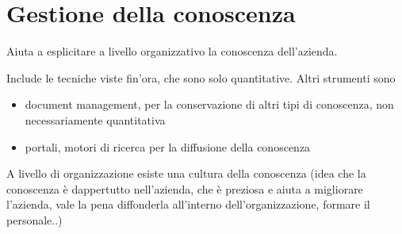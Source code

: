 \section{Gestione della conoscenza}\label{gestione-della-conoscenza}

Aiuta a esplicitare a livello organizzativo la conoscenza dell'azienda.

Include le tecniche viste fin'ora, che sono solo quantitative. Altri
strumenti sono

\begin{itemize}

\item
  document management, per la conservazione di altri tipi di conoscenza,
  non necessariamente quantitativa
\item
  portali, motori di ricerca per la diffusione della conoscenza
\end{itemize}

A livello di organizzazione esiste una cultura della conoscenza (idea
che la conoscenza è dappertutto nell'azienda, che è preziosa e aiuta a
migliorare l'azienda, vale la pena diffonderla all'interno
dell'organizzazione, formare il personale..)
